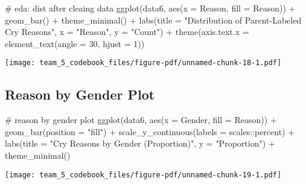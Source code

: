 \documentclass[
  letterpaper,
  DIV=11,
  numbers=noendperiod]{scrartcl}
\newenvironment{Shaded}{\begin{snugshade}}{\end{snugshade}}
\newcommand{\AttributeTok}[1]{\textcolor[rgb]{0.40,0.45,0.13}{#1}}
\newcommand{\CommentTok}[1]{\textcolor[rgb]{0.37,0.37,0.37}{#1}}
\newcommand{\DecValTok}[1]{\textcolor[rgb]{0.68,0.00,0.00}{#1}}
\newcommand{\FunctionTok}[1]{\textcolor[rgb]{0.28,0.35,0.67}{#1}}
\newcommand{\NormalTok}[1]{\textcolor[rgb]{0.00,0.23,0.31}{#1}}
\newcommand{\SpecialCharTok}[1]{\textcolor[rgb]{0.37,0.37,0.37}{#1}}
\newcommand{\StringTok}[1]{\textcolor[rgb]{0.13,0.47,0.30}{#1}}
\begin{document}
\begin{Shaded}
\begin{Highlighting}[]
\CommentTok{\# eda: dist after cleaing data}
\FunctionTok{ggplot}\NormalTok{(data6, }\FunctionTok{aes}\NormalTok{(}\AttributeTok{x =}\NormalTok{ Reason, }\AttributeTok{fill =}\NormalTok{ Reason)) }\SpecialCharTok{+}
  \FunctionTok{geom\_bar}\NormalTok{() }\SpecialCharTok{+}
  \FunctionTok{theme\_minimal}\NormalTok{() }\SpecialCharTok{+}
  \FunctionTok{labs}\NormalTok{(}\AttributeTok{title =} \StringTok{"Distribution of Parent{-}Labeled Cry Reasons"}\NormalTok{, }\AttributeTok{x =} \StringTok{"Reason"}\NormalTok{, }\AttributeTok{y =} \StringTok{"Count"}\NormalTok{) }\SpecialCharTok{+}
  \FunctionTok{theme}\NormalTok{(}\AttributeTok{axis.text.x =} \FunctionTok{element\_text}\NormalTok{(}\AttributeTok{angle =} \DecValTok{30}\NormalTok{, }\AttributeTok{hjust =} \DecValTok{1}\NormalTok{))}
\end{Highlighting}
\end{Shaded}

\begin{center}
\texttt{[image: team\_5\_codebook\_files/figure-pdf/unnamed-chunk-18-1.pdf]}
\end{center}

\subsection{Reason by Gender Plot}\label{reason-by-gender-plot}

\begin{Shaded}
\begin{Highlighting}[]
\CommentTok{\# reason by gender plot}
\FunctionTok{ggplot}\NormalTok{(data6, }\FunctionTok{aes}\NormalTok{(}\AttributeTok{x =}\NormalTok{ Gender, }\AttributeTok{fill =}\NormalTok{ Reason)) }\SpecialCharTok{+}
  \FunctionTok{geom\_bar}\NormalTok{(}\AttributeTok{position =} \StringTok{"fill"}\NormalTok{) }\SpecialCharTok{+}
  \FunctionTok{scale\_y\_continuous}\NormalTok{(}\AttributeTok{labels =}\NormalTok{ scales}\SpecialCharTok{::}\NormalTok{percent) }\SpecialCharTok{+}
  \FunctionTok{labs}\NormalTok{(}\AttributeTok{title =} \StringTok{"Cry Reasons by Gender (Proportion)"}\NormalTok{, }\AttributeTok{y =} \StringTok{"Proportion"}\NormalTok{) }\SpecialCharTok{+}
  \FunctionTok{theme\_minimal}\NormalTok{()}
\end{Highlighting}
\end{Shaded}

\begin{center}
\texttt{[image: team\_5\_codebook\_files/figure-pdf/unnamed-chunk-19-1.pdf]}
\end{center}
\end{document}
